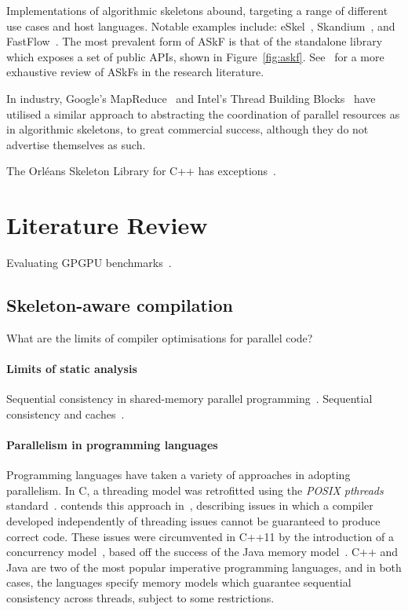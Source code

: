 Implementations of algorithmic skeletons abound, targeting a range of
different use cases and host languages. Notable examples include:
eSkel~\cite{Benoit2005a}, Skandium~\cite{Leyton2010}, and
FastFlow~\cite{Aldinucci2011}. The most prevalent form of ASkF is that
of the standalone library which exposes a set of public APIs, shown in
Figure~\ref{fig:askf}. See~\cite{Gonzalez2010} for a more exhaustive
review of ASkFs in the research literature.

In industry, Google's MapReduce~\cite{Dean2008} and Intel's Thread
Building Blocks~\cite{IntelTBB} have utilised a similar approach to
abstracting the coordination of parallel resources as in algorithmic
skeletons, to great commercial success, although they do not advertise
themselves as such.

The Orléans Skeleton Library for C++ has exceptions~\cite{Legaux2013}.


\section{Literature Review}


Evaluating GPGPU benchmarks~\cite{Ryoo2015}.

\subsection{Skeleton-aware compilation}

What are the limits of compiler optimisations for parallel code?

\paragraph{Limits of static analysis} Sequential consistency in
shared-memory parallel
programming~\cite{Krishnamurthy1995,Shasha1988,Sura2005}. Sequential
consistency and caches~\cite{Goodman}.

\paragraph{Parallelism in programming languages} Programming languages
have taken a variety of approaches in adopting parallelism. In C, a
threading model was retrofitted using the \textit{POSIX pthreads}
standard~\cite{Sura2005}. \citeauthor{Boehm2005} contends this
approach in~\cite{Boehm2005}, describing issues in which a compiler
developed independently of threading issues cannot be guaranteed to
produce correct code. These issues were circumvented in C++11 by the
introduction of a concurrency model~\cite{Boehm2008}, based off the
success of the Java memory model~\cite{Bash2015a}. C++ and Java are
two of the most popular imperative programming languages, and in both
cases, the languages specify memory models which guarantee sequential
consistency across threads, subject to some restrictions.

